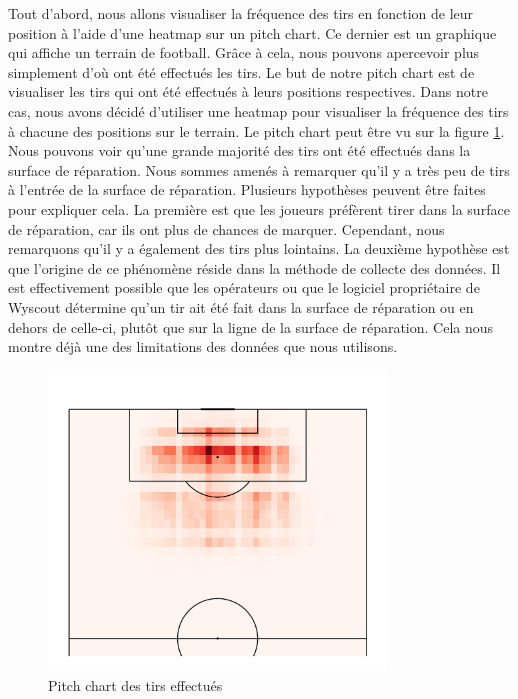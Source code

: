\documentclass[12pt]{article}
\begin{document}
Tout d'abord, nous allons visualiser la fréquence des tirs en fonction de leur position à l'aide d'une heatmap sur un pitch chart.
Ce dernier est un graphique qui affiche un terrain de football.
Grâce à cela, nous pouvons apercevoir plus simplement d'où ont été effectués les tirs.
Le but de notre pitch chart est de visualiser les tirs qui ont été effectués à leurs positions respectives.
Dans notre cas, nous avons décidé d'utiliser une heatmap pour visualiser la fréquence des tirs à chacune des positions sur le terrain.
Le pitch chart peut être vu sur la figure \ref{fig:pitch_chart}.
Nous pouvons voir qu'une grande majorité des tirs ont été effectués dans la surface de réparation.
Nous sommes amenés à remarquer qu'il y a très peu de tirs à l'entrée de la surface de réparation.
Plusieurs hypothèses peuvent être faites pour expliquer cela.
La première est que les joueurs préfèrent tirer dans la surface de réparation, car ils ont plus de chances de marquer. 
Cependant, nous remarquons qu'il y a également des tirs plus lointains.
La deuxième hypothèse est que l'origine de ce phénomène réside dans la méthode de collecte des données.
Il est effectivement possible que les opérateurs ou que le logiciel propriétaire de Wyscout détermine qu'un tir ait été fait dans la surface de réparation ou en dehors de celle-ci, plutôt que sur la ligne de la surface de réparation.
Cela nous montre déjà une des limitations des données que nous utilisons.
\begin{figure}[htp]
    \centering
    \includegraphics[width=0.8\textwidth]{img/pitchChartFrequency.png}
    \caption{Pitch chart des tirs effectués}
    \label{fig:pitch_chart}
\end{figure}
\end{document}

